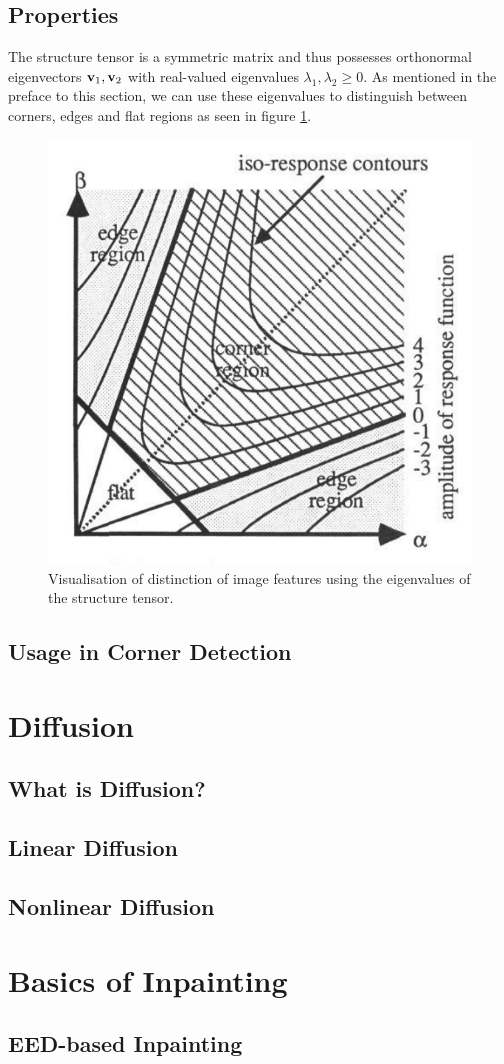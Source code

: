 \subsection{Properties}
The structure tensor is a symmetric matrix and thus possesses orthonormal eigenvectors $\bold v_1,
\bold v_2$ with real-valued eigenvalues $\lambda_1, \lambda_2 \geq 0$. \cite{ipcv19-13} As
mentioned in the preface to this section, we can use these eigenvalues to distinguish between
corners, edges and flat regions as seen in figure \ref{fig:Structure}.
\begin{figure}
    \centering
    \includegraphics[height=0.25\pdfpageheight]{../Images/structure_tensor.png}
    \caption{Visualisation of distinction of image features using the eigenvalues of the structure
        tensor.\cite{harris88}}\label{fig:Structure}
\end{figure}
\subsection{Usage in Corner Detection}
\section{Diffusion}\label{sec:Diffusion}
\subsection{What is Diffusion?}
\subsection{Linear Diffusion}
\subsection{Nonlinear Diffusion}\label{sub:NonlinearDiff}
\section{Basics of Inpainting}\label{sec:Inpainting}
\subsection{EED-based Inpainting}
